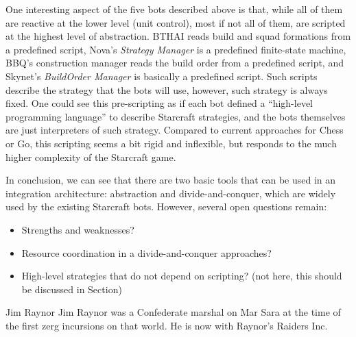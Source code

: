 \documentclass[journal]{IEEEtran}
\begin{document}
One interesting aspect of the five bots described above is that, while all of them are reactive at the lower level (unit control), most if not all of them, are scripted at the highest level of abstraction. BTHAI reads build and squad formations from a predefined script, Nova's {\em Strategy Manager} is a predefined finite-state machine, BBQ's construction manager reads the build order from a predefined script, and Skynet's {\em BuildOrder Manager} is basically a predefined script. Such scripts describe the strategy that the bots will use, however, such strategy is always fixed. One could see this pre-scripting as if each bot defined a ``high-level programming language'' to describe Starcraft strategies, and the bots themselves are just interpreters of such strategy. Compared to current approaches for Chess or Go, this scripting seems a bit rigid and inflexible, but responds to the much higher complexity of the Starcraft game.

In conclusion, we can see that there are two basic tools that can be used in an integration architecture: abstraction and divide-and-conquer, which are widely used by the existing Starcraft bots. However, several open questions remain:

{\color{blue}
\begin{itemize}
\item Strengths and weaknesses?
\item Resource coordination in a divide-and-conquer approaches?
\item High-level strategies that do not depend on scripting? (not here, this should be discussed in Section) %
\end{itemize}
}



\ifCLASSOPTIONcaptionsoff
  \newpage
\fi

                                                    



\begin{IEEEbiography}{Jim Raynor}
Jim Raynor was a Confederate marshal on Mar Sara at the time of the first zerg incursions on that world. He is now with Raynor's Raiders Inc.
\end{IEEEbiography}
\end{document}
